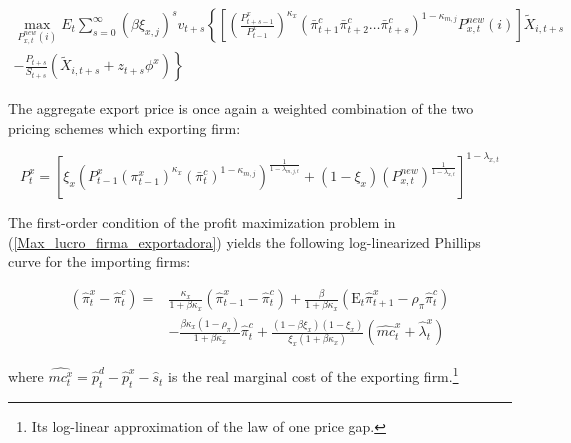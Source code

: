 \documentclass[12pt,oneside,a4paper]{article}
\begin{document}
\begin{equation}
\label{Max_lucro_firma_exportadora}
\begin{array}{c}
    \max _{P_{x,t}^{new}(i)} E_{t} \sum_{s=0}^{\infty}\left(\beta \xi_{x, j}\right)^{s} v_{t+s}\left\{\left[\left(\frac{P_{t+s-1}^{x}}{P_{t-1}^{x}}\right)^{\kappa_{x}}\left(\bar{\pi}_{t+1}^{c} \bar{\pi}_{t+2}^{c} \ldots \bar{\pi}_{t+s}^{c}\right)^{1-\kappa_{m, j}}  P_{x,t}^{new}(i)\right] \tilde{X}_{i, t+s}\right. \\
    \left.-\frac{P_{t+s}}{S_{t+s}}\left(\tilde{X}_{i, t+s}+z_{t+s} \phi^{x}\right)\right\}
    \end{array}
\end{equation}

The aggregate export price is once again a weighted combination of the two pricing schemes which exporting firm:

\begin{equation}
P_{t}^{x}=\left[\xi_{x}\left(P_{t-1}^{x}\left(\pi_{t-1}^{x}\right)^{\kappa_{x}}\left(\bar{\pi}_{t}^{c}\right)^{1-\kappa_{m, j}}\right)^{\frac{1}{1-\lambda_{m, j, t}}}+\left(1-\xi_{x}\right)\left(P_{x, t}^{n e w}\right)^{\frac{1}{1-\lambda_{x, t}}}\right]^{1-\lambda_{x, t}}
\end{equation}

The first-order condition of the profit maximization problem in (\ref{Max_lucro_firma_exportadora}) yields the following log-linearized Phillips curve for the importing firms:

\begin{equation}
    \begin{aligned}
    \left(\widehat{\pi}_{t}^{x}-\widehat{\pi}_{t}^{c}\right)=& \frac{\kappa_{x}}{1+\beta \kappa_{x}}\left(\widehat{\pi}_{t-1}^{x}-\widehat{\pi}_{t}^{c}\right)+\frac{\beta}{1+\beta \kappa_{x}}\left(\mathrm{E}_{t} \widehat{\pi}_{t+1}^{x}-\rho_{\pi} \widehat{\pi}_{t}^{c}\right) \\
    &-\frac{\beta \kappa_{x}\left(1-\rho_{\pi}\right)}{1+\beta \kappa_{x}} \widehat{\pi}_{t}^{c}+\frac{\left(1-\beta \xi_{x}\right)\left(1-\xi_{x}\right)}{\xi_{x}\left(1+\beta \kappa_{x}\right)}\left(\widehat{m c}_{t}^{x}+\widehat{\lambda}_{t}^{x}\right)
\end{aligned}
\end{equation}

where $\widehat{m c_{t}^{x}}=\widehat{p}_{t}^{d}-\widehat{p}_{t}^{x}-\widehat{s}_{t}$ is the real marginal cost of the exporting firm.\footnote{Its log-linear approximation of the
law of one price gap.}
\end{document}

